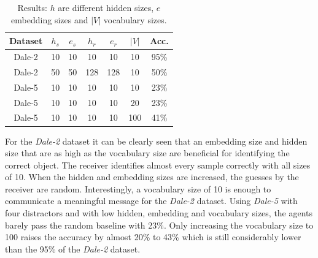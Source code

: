 \documentclass[11pt]{article}
\begin{document}
\begin{table}
  \centering
  \begin{tabular}{c|ccccc|c}
    \hline
    \textbf{Dataset} & $h_{s}$ & $e_{s}$ & $h_{r}$ & $e_{r}$ & $|V|$ & \textbf{Acc.} \\
    \hline
    Dale-2           & {10}    & {10}    & {10}    & {10}    & {10}  & {95\%}        \\
    Dale-2           & {50}    & {50}    & {128}   & {128}   & {10}  & {50\%}        \\
    Dale-5           & {10}    & {10}    & {10}    & {10}    & {10}  & {23\%}        \\
    Dale-5           & {10}    & {10}    & {10}    & {10}    & {20}  & {23\%}        \\
    Dale-5           & {10}    & {10}    & {10}    & {10}    & {100} & {41\%}        \\
    \hline
  \end{tabular}
  \caption{Results: $h$ are different hidden sizes, $e$ embedding sizes and $|V|$ vocabulary sizes.}
  \label{tab:results}
\end{table}

For the \emph{Dale-2} dataset it can be clearly seen that an embedding size and hidden size that are as high as the vocabulary size are beneficial for identifying the correct object.
The receiver identifies almost every sample correctly with all sizes of 10.
When the hidden and embedding sizes are increased, the guesses by the receiver are random.
Interestingly, a vocabulary size of 10 is enough to communicate a meaningful message for the \emph{Dale-2} dataset.
%
%
Using \emph{Dale-5} with four distractors and with low hidden, embedding and vocabulary sizes, the agents barely pass the random baseline with 23\%.
Only increasing the vocabulary size to 100 raises the accuracy by almost 20\% to 43\% which is still considerably lower than the 95\% of the \emph{Dale-2} dataset.

\end{document}
